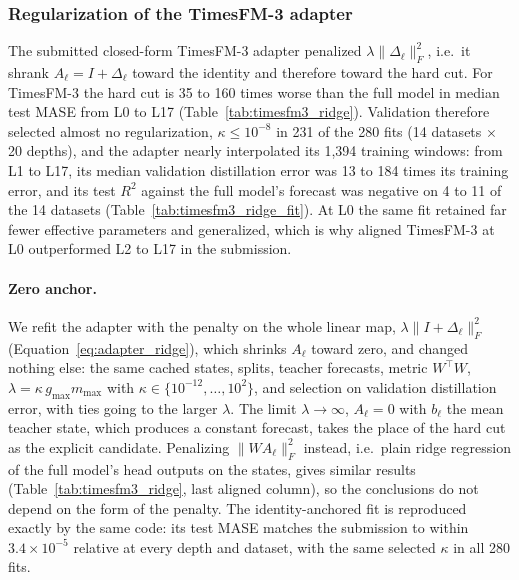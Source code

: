
\subsubsection{Regularization of the TimesFM-3 adapter}
\label{sec:app_timesfm3_ridge}

The submitted closed-form TimesFM-3 adapter penalized $\lambda\|\Delta_\ell\|_F^2$, i.e.\ it shrank $A_\ell=I+\Delta_\ell$ toward the identity and therefore toward the hard cut. For TimesFM-3 the hard cut is 35 to 160 times worse than the full model in median test MASE from L0 to L17 (Table~\ref{tab:timesfm3_ridge}). Validation therefore selected almost no regularization, $\kappa\le10^{-8}$ in 231 of the 280 fits (14 datasets $\times$ 20 depths), and the adapter nearly interpolated its 1,394 training windows: from L1 to L17, its median validation distillation error was 13 to 184 times its training error, and its test $R^2$ against the full model's forecast was negative on 4 to 11 of the 14 datasets (Table~\ref{tab:timesfm3_ridge_fit}). At L0 the same fit retained far fewer effective parameters and generalized, which is why aligned TimesFM-3 at L0 outperformed L2 to L17 in the submission.

\paragraph{Zero anchor.} We refit the adapter with the penalty on the whole linear map, $\lambda\|I+\Delta_\ell\|_F^2$ (Equation~\ref{eq:adapter_ridge}), which shrinks $A_\ell$ toward zero, and changed nothing else: the same cached states, splits, teacher forecasts, metric $W^\top W$, $\lambda=\kappa\,g_{\max}m_{\max}$ with $\kappa\in\{10^{-12},\dots,10^{2}\}$, and selection on validation distillation error, with ties going to the larger $\lambda$. The limit $\lambda\to\infty$, $A_\ell=0$ with $b_\ell$ the mean teacher state, which produces a constant forecast, takes the place of the hard cut as the explicit candidate. Penalizing $\|W A_\ell\|_F^2$ instead, i.e.\ plain ridge regression of the full model's head outputs on the states, gives similar results (Table~\ref{tab:timesfm3_ridge}, last aligned column), so the conclusions do not depend on the form of the penalty. The identity-anchored fit is reproduced exactly by the same code: its test MASE matches the submission to within $3.4\times10^{-5}$ relative at every depth and dataset, with the same selected $\kappa$ in all 280 fits.

